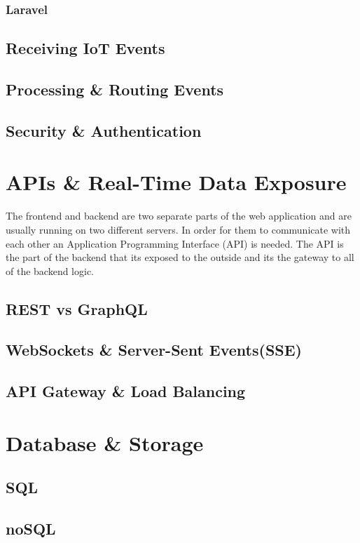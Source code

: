 \subsubsection{Laravel}

\subsection{Receiving IoT Events}

\subsection{Processing \& Routing Events}

\subsection{Security \& Authentication}


\section{APIs \& Real-Time Data Exposure}
The frontend and backend are two separate parts of the web application and are
usually running on two different servers. In order for them to communicate with
each other an Application Programming Interface (API) is needed. The API is the
part of the backend that its exposed to the outside and its the gateway to all
of the backend logic.
\subsection{REST vs GraphQL}
\subsection{WebSockets \& Server-Sent Events(SSE)}
\subsection{API Gateway \& Load Balancing}

\section{Database \& Storage}
\subsection{SQL}
\subsection{noSQL}
